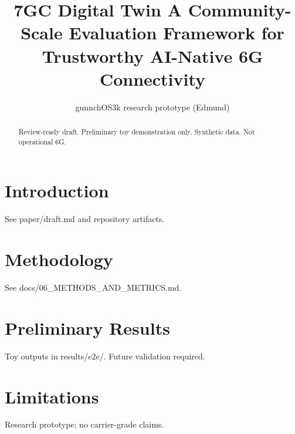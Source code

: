 \documentclass{article}
\title{7GC Digital Twin A Community-Scale Evaluation Framework for Trustworthy AI-Native 6G Connectivity}
\author{gunnchOS3k research prototype (Edmund)}
\begin{document}
\maketitle
\begin{abstract}
Review-ready draft. Preliminary toy demonstration only. Synthetic data. Not operational 6G.
\end{abstract}
\section{Introduction}
See paper/draft.md and repository artifacts.
\section{Methodology}
See docs/06\_METHODS\_AND\_METRICS.md.
\section{Preliminary Results}
Toy outputs in results/e2e/. Future validation required.
\section{Limitations}
Research prototype; no carrier-grade claims.


\end{document}

